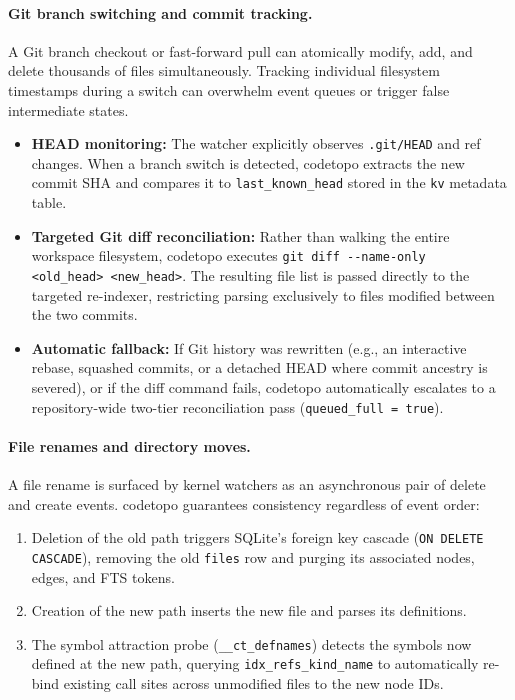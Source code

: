 \paragraph{Git branch switching and commit tracking.} A Git branch checkout or fast-forward pull can atomically
modify, add, and delete thousands of files simultaneously. Tracking individual filesystem timestamps during a switch
can overwhelm event queues or trigger false intermediate states.
\begin{itemize}
  \item \textbf{HEAD monitoring:} The watcher explicitly observes \texttt{.git/HEAD} and ref changes. When a
        branch switch is detected, codetopo extracts the new commit SHA and compares it to \texttt{last\_known\_head}
        stored in the \texttt{kv} metadata table.
  \item \textbf{Targeted Git diff reconciliation:} Rather than walking the entire workspace filesystem, codetopo
        executes \texttt{git diff -{}-name-only \textless old\_head\textgreater\ \textless new\_head\textgreater}. The resulting file list is passed directly to
        the targeted re-indexer, restricting parsing exclusively to files modified between the two commits.
  \item \textbf{Automatic fallback:} If Git history was rewritten (e.g., an interactive rebase, squashed commits, or
        a detached HEAD where commit ancestry is severed), or if the diff command fails, codetopo automatically
        escalates to a repository-wide two-tier reconciliation pass (\texttt{queued\_full = true}).
\end{itemize}

\paragraph{File renames and directory moves.} A file rename is surfaced by kernel watchers as an asynchronous pair
of delete and create events. codetopo guarantees consistency regardless of event order:
\begin{enumerate}
  \item Deletion of the old path triggers SQLite's foreign key cascade (\texttt{ON DELETE CASCADE}), removing the
        old \texttt{files} row and purging its associated nodes, edges, and FTS tokens.
  \item Creation of the new path inserts the new file and parses its definitions.
  \item The symbol attraction probe (\texttt{\_\_ct\_defnames}) detects the symbols now defined at the new path,
        querying \texttt{idx\_refs\_kind\_name} to automatically re-bind existing call sites across unmodified files
        to the new node IDs.
\end{enumerate}

